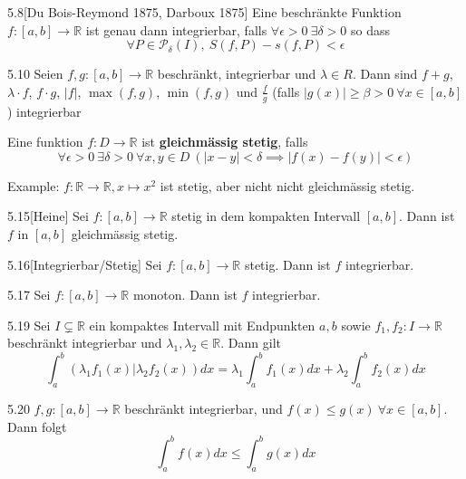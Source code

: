 \documentclass[8pt,a4paper,twocolumn,table]{extarticle}
\newcommand{\R}{\mathbb{R}}
\begin{document}
\begin{satz}{5.8}[Du Bois-Reymond 1875, Darboux 1875]
    Eine beschränkte Funktion $f: [a, b] \to \R$ ist genau dann integrierbar, falls $\forall \epsilon > 0\ \exists \delta > 0$
    so dass
    \[ \forall P \in \mathcal{P}_\delta(I),\ S(f, P) - s(f, P) < \epsilon \]
\end{satz}

\begin{satz}{5.10}
    Seien $f, g: [a, b] \to \R$ beschränkt, integrierbar und $\lambda \in R$. Dann sind $f + g$, $\lambda \cdot f$, $f \cdot g$, $|f|$,
    $\max(f, g)$, $\min(f, g)$ und $\frac{f}{g}$ (falls $|g(x)| \ge \beta > 0\ \forall x \in [a, b]$) integrierbar
\end{satz}

\begin{definition}
    Eine funktion $f: D \to \R$ ist \textbf{gleichmässig stetig}, falls
    \[ \forall \epsilon > 0\ \exists \delta > 0\ \forall x,y \in D\ \left( |x - y| < \delta \implies |f(x) - f(y)| < \epsilon \right) \]

    Example: $f: \R \to \R, x \mapsto x^2$ ist stetig, aber nicht nicht gleichmässig stetig.
\end{definition}

\begin{satz}{5.15}[Heine]
    Sei $f: [a,b] \to \R$ stetig in dem kompakten Intervall $[a,b]$. Dann ist $f$ in $[a,b]$ gleichmässig stetig.
\end{satz}

\begin{satz}{5.16}[Integrierbar/Stetig]
    Sei $f: [a,b] \to \R$ stetig. Dann ist $f$ integrierbar.
\end{satz}

\begin{satz}{5.17}
    Sei $f: [a,b] \to \R$ monoton. Dann ist $f$ integrierbar.
\end{satz}

\begin{satz}{5.19}
    Sei $I \subsetneq \R$ ein kompaktes Intervall mit Endpunkten $a, b$ sowie $f_1, f_2: I \to \R$ beschränkt integrierbar
    und $\lambda_1,\lambda_2 \in \R$. Dann gilt
    \[ \int_a^b (\lambda_1 f_1(x) | \lambda_2 f_2(x)) dx = \lambda_1 \int_a^b f_1(x)dx + \lambda_2 \int_a^b f_2(x) dx \]
\end{satz}

\begin{satz}{5.20}
    $f, g: [a,b] \to \R$ beschränkt integrierbar, und $f(x) \le g(x)\ \forall x \in [a, b]$.
    Dann folgt
    \[ \int_a^b f(x)dx \le \int_a^b g(x)dx \]
\end{satz}
\end{document}
